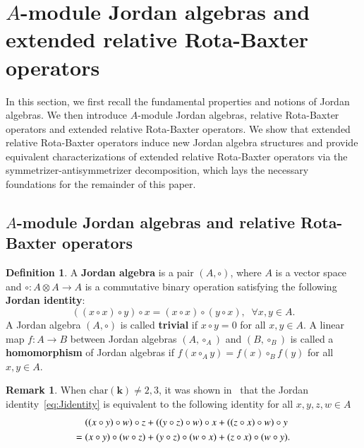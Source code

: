 \documentclass[12pt, reqno, a4paper]{amsart}
\theoremstyle{definition}
\newtheorem{definition}[theorem]{Definition}
\newtheorem{remark}[theorem]{Remark}
\newcommand{\Char}{\mathrm{char}}
\begin{document}
\section{\texorpdfstring{$A$}{A}-module Jordan algebras and extended relative Rota-Baxter operators}\label{sec:ajaerrb}

In this section, we first recall the fundamental properties and notions of Jordan algebras.
We then introduce $A$-module Jordan algebras, relative Rota-Baxter operators and extended relative Rota-Baxter operators.
We show that extended relative Rota-Baxter operators induce new Jordan algebra structures and provide equivalent characterizations of extended relative Rota-Baxter operators via the symmetrizer-antisymmetrizer decomposition, which lays the necessary foundations for the remainder of this paper.

\subsection{\texorpdfstring{$A$}{A}-module Jordan algebras and relative Rota-Baxter operators}

\begin{definition}
	A {\bf Jordan algebra} is a pair $(A, \circ)$, where $A$ is a vector space and $\circ : A \otimes A \to A$ is a commutative binary operation satisfying the following \textbf{Jordan identity}:
	\begin{equation}
		((x \circ x) \circ y) \circ x = (x \circ x) \circ (y \circ x), \;\; \forall x, y \in A. \label{eq:Jidentity}
	\end{equation}
	A Jordan algebra $(A, \circ)$ is called \textbf{trivial} if $x \circ y = 0$ for all $x, y \in A$.
	A linear map $f: A \to B$ between Jordan algebras $(A, \circ_A)$ and $(B, \circ_B)$ is called a \textbf{homomorphism} of Jordan algebras if $f(x \circ_A y) = f(x) \circ_B f(y)$ for all $x, y \in A$.
\end{definition}


\begin{remark}
	When $\Char(\mathbb{\mathbf{k}}) \neq 2, 3$, it was shown in~\cite{albert1947structure} that the Jordan identity~\eqref{eq:Jidentity} is equivalent to the following identity for all $x, y, z, w \in A$
	\begin{align}
		& ((x \circ y) \circ w) \circ z + ((y \circ z) \circ w) \circ x+((z \circ x) \circ w) \circ y \notag            \\
		=\; & (x \circ y) \circ(w \circ z) + (y \circ z) \circ (w \circ x) + (z \circ x) \circ (w \circ y). \label{eq:jord}
	\end{align}
\end{remark}
\end{document}

